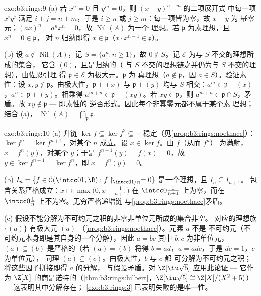 \begin{solution}{exo:b3:rings:9}
(a) 若 $x^n = 0$ 且 $y^m = 0$，则 $(x+y)^{n+m}$ 的二项展开式
中每一项 $x^iy^j$ 满足 $i + j = n + m$，于是 $i
\geq n$ 或 $j \geq m$：每一项皆为零，故 $x + y$ 为
幂零元；$(ax)^n = a^nx^n = 0$，故 $\operatorname{Nil}(A)$ 为一个
理想。若 $\mathfrak p$ 为素理想，且 $x^n = 0 \in \mathfrak p$，
对 $n$ 归纳即得 $x \in \mathfrak p$（$x \cdot x^{n-1} \in
\mathfrak p$）。

(b) 设 $a \notin \operatorname{Nil}(A)$，记 $S = \{a^n : n \geq
1\}$，故 $0 \notin S$。记 $\mathcal E$ 为与 $S$ 不交的理想所成的集合，
它含 $(0)$，且是归纳的（
与 $S$ 不交的理想链之并仍为与 $S$ 不交的理想），由佐恩引理
得 $\mathfrak p \in \mathcal E$ 为极大元。$\mathfrak p$ 为
真理想（$a \notin \mathfrak p$，因 $a \in S$）。验证素性：设
$x, y \notin \mathfrak p$。由极大性，$\mathfrak p + (x)$ 与
$\mathfrak p + (y)$ 均与 $S$ 相交：$a^m \in \mathfrak p + (x)$，$a^n
\in \mathfrak p + (y)$。相乘得 $a^{m+n} \in \mathfrak p +
(xy)$。若 $xy \in \mathfrak p$，则 $a^{m+n} \in \mathfrak p \cap
S$，矛盾。故 $xy \notin \mathfrak p$ --- 即素性的
逆否形式。因此每个非幂零元都不属于某个素
理想；结合 (a)，
$\operatorname{Nil}(A) = \bigcap_{\mathfrak p} \mathfrak p$.
\end{solution}

\begin{solution}{exo:b3:rings:10}
(a) 升链 $\ker f \subseteq \ker f^2 \subseteq \cdots$
稳定（见\cref{prop:b3:rings:noethacc}）：$\ker f^n = \ker
f^{n+1}$，对某个 $n$ 成立。设 $x \in \ker f$。由 $f$（从而 $f^n$）
为满射，$x = f^n(y)$，对某个 $y$；于是 $f^{n+1}(y) = f(x) =
0$，故 $y \in \ker f^{n+1} = \ker f^n$，即 $x = f^n(y) = 0$。

(b) $I_n = \{f \in \mathcal C(\intcc01, \R) : f\restriction_{
\intcc0{1/n}} = 0\}$ 是一个理想，且 $I_n \subseteq I_{n+1}$。
包含关系严格成立：$x \mapsto \max\bigl(0, x -
\frac1{n+1}\bigr)$ 在 $\intcc0{\frac1{n+1}}$ 上为零，而在
$\intcc0{\frac1n}$ 上不为零。无穷严格递增链
与\cref{prop:b3:rings:noethacc}矛盾。

(c) 假设不能分解为不可约元之积的非零非单位元所成的集合非空。
对应的理想族
$\{(a)\}$ 有极大元 $(a)$
（\cref{prop:b3:rings:noethacc}）。元素 $a$ 不是
不可约元（不可约元本身即是其自身的一个分解），因此 $a = bc$
其中 $b, c$ 为非单位元，$(a) \subseteq (b)$ 是严格的（若 $(a) =
(b)$ 将得 $b = ad$，$a = adc$，于是 $dc = 1$，$c$ 为单位元），
同理 $(a) \subsetneq (c)$。由极大性，$b$ 与 $c$ 都
可分解为不可约元之积；将这些因子拼接即得 $a$ 的分解，
与假设矛盾。对 $\Z[\iu\sqrt5]$ 应用此论证 --- 它作为
$\Z[X]$ 的商是诺特的（\cref{thm:b3:rings:hilbert}，$\Z[\iu\sqrt5]
\cong \Z[X]/(X^2+5)$） --- 这表明其中分解存在；
\cref{exo:b3:rings:3} 已表明失败的是唯一性。
\end{solution}

